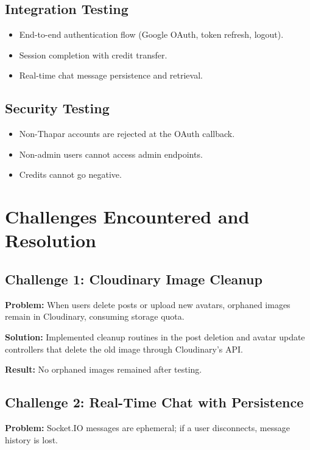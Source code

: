 \documentclass{tietreport}
\begin{document}
\subsection{Integration Testing}

\begin{itemize}
  \item End-to-end authentication flow (Google OAuth, token refresh, logout).
  \item Session completion with credit transfer.
  \item Real-time chat message persistence and retrieval.
\end{itemize}

\subsection{Security Testing}

\begin{itemize}
  \item Non-Thapar accounts are rejected at the OAuth callback.
  \item Non-admin users cannot access admin endpoints.
  \item Credits cannot go negative.
\end{itemize}

\section{Challenges Encountered and Resolution}

\subsection{Challenge 1: Cloudinary Image Cleanup}

\textbf{Problem:} When users delete posts or upload new avatars, orphaned images remain in Cloudinary, consuming storage quota.

\textbf{Solution:} Implemented cleanup routines in the post deletion and avatar update controllers that delete the old image through Cloudinary's API.

\textbf{Result:} No orphaned images remained after testing.

\subsection{Challenge 2: Real-Time Chat with Persistence}

\textbf{Problem:} Socket.IO messages are ephemeral; if a user disconnects, message history is lost.
\end{document}
